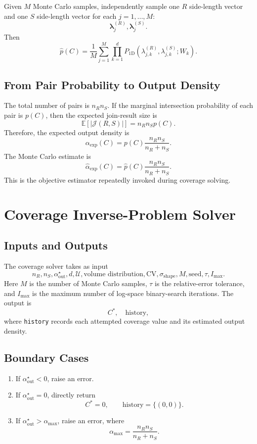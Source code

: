 \documentclass[11pt,a4paper]{article}
\newcommand{\Uset}{\mathcal{U}}
\newcommand{\Jset}{\mathcal{J}}
\newcommand{\Exp}{\mathbb{E}}
\newcommand{\code}[1]{\texttt{#1}}
\begin{document}
Given $M$ Monte Carlo samples, independently sample one $R$ side-length vector and one $S$ side-length vector for each $j=1,\dots,M$:
\[
  \boldsymbol\lambda_{j}^{(R)},
  \boldsymbol\lambda_{j}^{(S)}.
\]
Then
\[
  \widehat p(C)
  =
  \frac1M\sum_{j=1}^{M}
  \prod_{k=1}^{d}
  P_{\mathrm{1D}}
  (\lambda^{(R)}_{j,k},
   \lambda^{(S)}_{j,k};
   W_k).
\]

\subsection{From Pair Probability to Output Density}

The total number of pairs is $n_Rn_S$. If the marginal intersection probability of each pair is $p(C)$, then the expected join-result size is
\[
  \Exp[|\Jset(R,S)|]=n_Rn_Sp(C).
\]
Therefore, the expected output density is
\[
  \alpha_{\mathrm{exp}}(C)
  =
  p(C)\frac{n_Rn_S}{n_R+n_S}.
\]
The Monte Carlo estimate is
\[
  \widehat\alpha_{\mathrm{exp}}(C)
  =
  \widehat p(C)\frac{n_Rn_S}{n_R+n_S}.
\]
This is the objective estimator repeatedly invoked during coverage solving.

\section{Coverage Inverse-Problem Solver}

\subsection{Inputs and Outputs}

The coverage solver takes as input
\[
  n_R,n_S,\alpha_{\mathrm{out}}^\star,d,
  \Uset,
  \text{volume distribution},
  \mathrm{CV},
  \sigma_{\mathrm{shape}},
  M,
  \text{seed},
  \tau,
  I_{\max}.
\]
Here $M$ is the number of Monte Carlo samples, $\tau$ is the relative-error tolerance, and $I_{\max}$ is the maximum number of log-space binary-search iterations. The output is
\[
  C^*,\quad \text{history},
\]
where \code{history} records each attempted coverage value and its estimated output density.

\subsection{Boundary Cases}

\begin{enumerate}
  \item If $\alpha_{\mathrm{out}}^\star<0$, raise an error.
  \item If $\alpha_{\mathrm{out}}^\star=0$, directly return
  \[
    C^*=0,
    \qquad
    \text{history}=\{(0,0)\}.
  \]
  \item If $\alpha_{\mathrm{out}}^\star>\alpha_{\max}$, raise an error, where
  \[
    \alpha_{\max}=\frac{n_Rn_S}{n_R+n_S}.
  \]
\end{enumerate}
\end{document}
